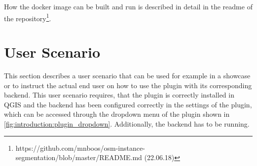 How the docker image can be built and run is described in detail in the readme of the repository\footnote{https://github.com/mnboos/osm-instance-segmentation/blob/master/README.md (22.06.18)}.

\section{User Scenario}
This section describes a user scenario that can be used for example in a showcase or to instruct the actual end user on how to use the plugin with its corresponding backend. This user scenario requires, that the plugin is correctly installed in QGIS and the backend has been configured correctly in the settings of the plugin, which can be accessed through the dropdown menu of the plugin shown in \autoref{fig:introduction:plugin_dropdown}. Additionally, the backend has to be running.
